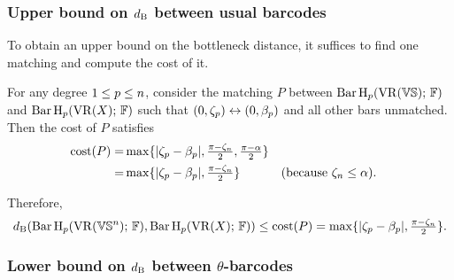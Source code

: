 % 	

% 	

\subsubsection{Upper bound on $\db$ between usual barcodes}
\label{subsub:db_upper_bound}

To obtain an upper bound on the bottleneck distance, it suffices to find one matching and compute the cost of it. 

For any degree $1 \leq \degp \leq n$, consider the matching $P$ between $\Hbarc[\field]{\degp}{\VS}$ and $\Hbarc[\field]{\degp}{X}$ such that $(0,\zeta_\degp ) \leftrightarrow (0, \beta_\degp )$ and all other bars unmatched. 
Then the cost of $P$ satisfies
\begin{align*}
    \cost(P) 
    = & \max\{|\zeta_\degp  - \beta_\degp |, \tfrac{\pi - \zeta_n}{2}, \tfrac{\pi - \alpha}{2}\} \\
    = & \max\{|\zeta_\degp  - \beta_\degp |, \tfrac{\pi - \zeta_n}{2}\} && \mbox{(because $\zeta_n \leq \alpha$)}.
\end{align*}

Therefore, 
\begin{equation}\label{eq:db_usual_upper_bound}
    \db(\Hbarc[\field]{\degp}{\VS^n}, \Hbarc[\field]{\degp}{X})
    \leq \cost(P) 
    = \max\{|\zeta_\degp  - \beta_\degp |, \tfrac{\pi - \zeta_n}{2}\}.
\end{equation}


\subsubsection{Lower bound on $\db$ between $\theta$-barcodes}
\label{subsub:db_theta_lower_bound}

